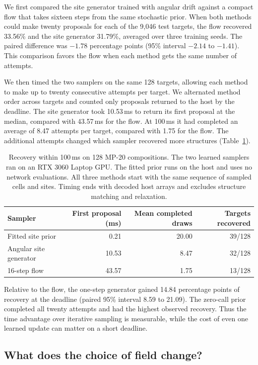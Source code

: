 We first compared the site generator trained with angular drift against a compact flow that takes sixteen steps from the same stochastic prior. When both methods could make twenty proposals for each of the 9,046 test targets, the flow recovered 33.56\% and the site generator 31.79\%, averaged over three training seeds. The paired difference was \(-1.78\) percentage points (95\% interval \(-2.14\) to \(-1.41\)). This comparison favors the flow when each method gets the same number of attempts.

We then timed the two samplers on the same 128 targets, allowing each method to make up to twenty consecutive attempts per target. We alternated method order across targets and counted only proposals returned to the host by the deadline. The site generator took 10.53\,ms to return its first proposal at the median, compared with 43.57\,ms for the flow. At 100\,ms it had completed an average of 8.47 attempts per target, compared with 1.75 for the flow. The additional attempts changed which sampler recovered more structures (Table~\ref{tab:site-time}).

\begin{table}[htbp]
\centering\small
\caption{Recovery within 100\,ms on 128 MP-20 compositions. The two learned samplers ran on an RTX 3060 Laptop GPU. The fitted prior runs on the host and uses no network evaluations. All three methods start with the same sequence of sampled cells and sites. Timing ends with decoded host arrays and excludes structure matching and relaxation.}
\label{tab:site-time}
\begin{tabular}{lrrr}\hline
Sampler & First proposal (ms) & Mean completed draws & Targets recovered\\\hline
Fitted site prior & 0.21 & 20.00 & 39/128\\
Angular site generator & 10.53 & 8.47 & 32/128\\
16-step flow & 43.57 & 1.75 & 13/128\\\hline
\end{tabular}
\end{table}

Relative to the flow, the one-step generator gained 14.84 percentage points of recovery at the deadline (paired 95\% interval 8.59 to 21.09). The zero-call prior completed all twenty attempts and had the highest observed recovery. Thus the time advantage over iterative sampling is measurable, while the cost of even one learned update can matter on a short deadline.

\subsection{What does the choice of field change?}

